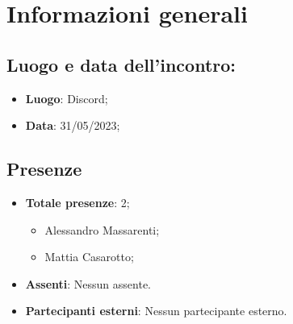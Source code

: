 \section{Informazioni generali}
    \subsection{Luogo e data dell'incontro:}
    \begin{itemize}
        \item \textbf{Luogo}: Discord;
        \item \textbf{Data}: 31/05/2023;
    \end{itemize}
    \subsection{Presenze}
    \begin{itemize}
        \item \textbf{Totale presenze}: 2;
        \begin{itemize}
            \item Alessandro Massarenti;
            \item Mattia Casarotto;
        \end{itemize}
        \item \textbf{Assenti}: Nessun assente.
        \item \textbf{Partecipanti esterni}: Nessun partecipante esterno.
    \end{itemize}